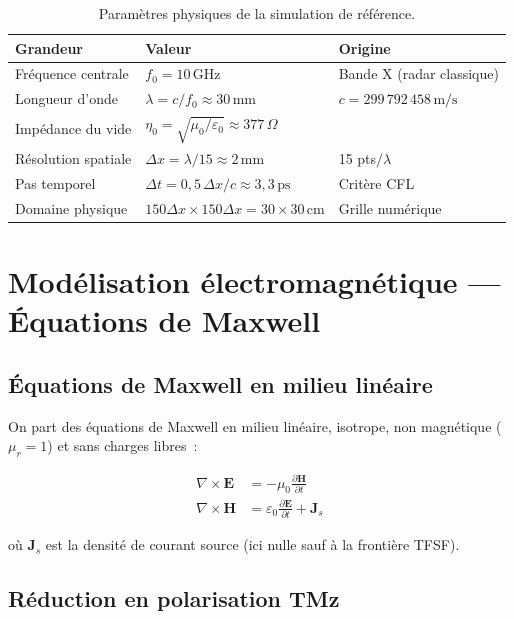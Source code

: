 \documentclass[12pt,a4paper]{article}
\newcommand{\vE}{\bm{E}}
\newcommand{\vH}{\bm{H}}
\newcommand{\vJ}{\bm{J}}
\newcommand{\eps}{\varepsilon}
\newcommand{\dx}{\Delta x}
\newcommand{\dt}{\Delta t}
\numberwithin{equation}{section}
\numberwithin{figure}{section}
\numberwithin{table}{section}
\begin{document}
\begin{table}[h!]
\centering
\caption{Paramètres physiques de la simulation de référence.}
\label{tab:params}
\begin{tabular}{lll}
\toprule
\textbf{Grandeur} & \textbf{Valeur} & \textbf{Origine} \\
\midrule
Fréquence centrale & $f_0 = 10\,\text{GHz}$ & Bande X (radar classique) \\
Longueur d'onde & $\lambda = c/f_0 \approx 30\,\text{mm}$ & $c = 299\,792\,458\,\text{m/s}$ \\
Impédance du vide & $\eta_0 = \sqrt{\mu_0/\eps_0} \approx 377\,\Omega$ & \\
Résolution spatiale & $\dx = \lambda / 15 \approx 2\,\text{mm}$ & 15 pts$/\lambda$ \\
Pas temporel & $\dt = 0{,}5\,\dx/c \approx 3{,}3\,\text{ps}$ & Critère CFL \\
Domaine physique & $150\dx \times 150\dx = 30 \times 30\,\text{cm}$ & Grille numérique \\
\bottomrule
\end{tabular}
\end{table}

\section{Modélisation électromagnétique --- Équations de Maxwell}

\subsection{Équations de Maxwell en milieu linéaire}

On part des équations de Maxwell en milieu linéaire, isotrope,
non magnétique ($\mu_r = 1$) et sans charges libres~:

\begin{align}
    \nabla \times \vE &= -\mu_0 \frac{\partial \vH}{\partial t}
    \label{eq:rot_E} \\
    \nabla \times \vH &= \eps_0 \frac{\partial \vE}{\partial t} + \vJ_s
    \label{eq:rot_H}
\end{align}

où $\vJ_s$ est la densité de courant source (ici nulle sauf à la frontière TFSF).

\subsection{Réduction en polarisation TMz}
\end{document}
